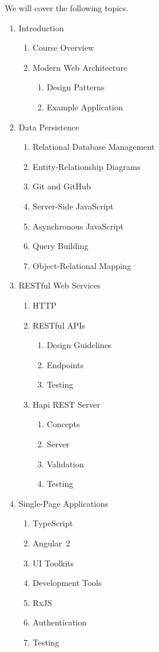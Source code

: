\documentclass[11pt]{article}
\begin{document}
We will cover the following topics.
\begin{enumerate}
\item Introduction
  \begin{enumerate}
  \item Course Overview
  \item Modern Web Architecture
    \begin{enumerate}
    \item Design Patterns
    \item Example Application
    \end{enumerate}
  \end{enumerate}
\item Data Persistence
  \begin{enumerate}
  \item Relational Database Management
  \item Entity-Relationship Diagrams
  \item Git and GitHub
  \item Server-Side JavaScript
  \item Asynchronous JavaScript
  \item Query Building
  \item Object-Relational Mapping
  \end{enumerate}
\item RESTful Web Services
  \begin{enumerate}
  \item HTTP
  \item RESTful APIs
    \begin{enumerate}
    \item Design Guidelines
    \item Endpoints
    \item Testing
    \end{enumerate}
  \item Hapi REST Server
    \begin{enumerate}
    \item Concepts
    \item Server
    \item Validation
    \item Testing
    \end{enumerate}
  \end{enumerate}
\item Single-Page Applications
  \begin{enumerate}
  \item TypeScript
  \item Angular~2
  \item UI Toolkits
  \item Development Tools
  \item RxJS
  \item Authentication
  \item Testing
  \end{enumerate}
\end{enumerate}
\end{document}
